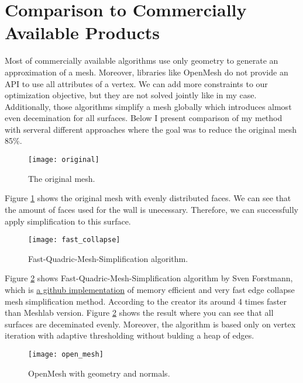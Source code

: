 \newpage
\section{Comparison to Commercially Available Products}

Most of commercially available algorithms use only geometry to generate an approximation of a mesh. Moreover, libraries like OpenMesh do not provide an API to use all attributes of a vertex. We can add more constraints to our optimization objective, but they are not solved jointly like in my case. Additionally, those algorithms simplify a mesh globally which introduces almost even decemination for all surfaces. Below I present comparison of my method with serveral different approaches where the goal was to reduce the original mesh 85\%.

\begin{figure}[H]
  \begin{center}
    \texttt{[image: original]}
    \caption{The original mesh.}
    \label{fig:original}
  \end{center}
\end{figure}

Figure \ref{fig:original} shows the original mesh with evenly distributed faces. We can see that the amount of faces used for the wall is unecessary. Therefore, we can successfully apply simplification to this surface.

\begin{figure}[H]
  \begin{center}
    \texttt{[image: fast\_collapse]}
    \caption{Fast-Quadric-Mesh-Simplification algorithm.}
    \label{fig:fast_collapse}
  \end{center}
\end{figure}

Figure \ref{fig:fast_collapse} shows Fast-Quadric-Mesh-Simplification algorithm by Sven Forstmann, which is \href{https://github.com/sp4cerat/Fast-Quadric-Mesh-Simplification}{a github implementation} of memory efficient and very fast edge collapse mesh simplification method. According to the creator its around 4 times faster than Meshlab version. Figure \ref{fig:fast_collapse} shows the result where you can see that all surfaces are deceminated evenly. Moreover, the algorithm is based only on vertex iteration with adaptive thresholding without bulding a heap of edges.

\begin{figure}[H]
  \begin{center}
    \texttt{[image: open\_mesh]}
    \caption{OpenMesh with geometry and normals.}
    \label{fig:open_mesh}
  \end{center}
\end{figure}

